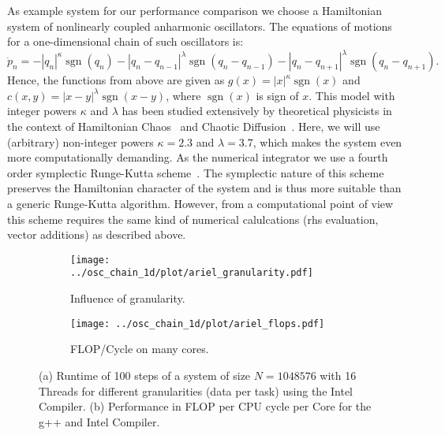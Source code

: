 \documentclass[10pt]{elsarticle}
\newcommand{\sgn}{\operatorname{sgn}}
\begin{document}
As example system for our performance comparison we choose a Hamiltonian system of nonlinearly coupled anharmonic oscillators.
The equations of motions for a one-dimensional chain of such oscillators is:
\begin{equation}
 \dot p_n = -|q_n|^\kappa\sgn(q_n) - |q_n-q_{n-1}|^\lambda\sgn(q_n-q_{n-1}) - |q_n-q_{n+1}|^\lambda\sgn(q_n-q_{n+1}).
\end{equation} 
Hence, the functions from above are given as $g(x) = |x|^\kappa\sgn(x)$ and $c(x,y)=|x-y|^\lambda\sgn(x-y)$, where $\sgn(x)$ is sign of $x$.
This model with integer powers $\kappa$ and $\lambda$ has been studied extensively by theoretical physicists in the context of Hamiltonian Chaos~\cite{Mulansky-Ahnert-Pikovsky-Shepelyansky-11} and Chaotic Diffusion~\cite{Mulansky_Pikovksy_12,mulansky2013energy,Mulansky_phd_12}.
Here, we will use (arbitrary) non-integer powers $\kappa=2.3$ and $\lambda=3.7$, which makes the system even more computationally demanding.
As the numerical integrator we use a fourth order symplectic Runge-Kutta scheme~\cite{McLachlan_95}.
The symplectic nature of this scheme preserves the Hamiltonian character of the system and is thus more suitable than a generic Runge-Kutta algorithm.
However, from a computational point of view this scheme requires the same kind of numerical calulcations (rhs evaluation, vector additions) as described above.

\begin{figure}
 \begin{subfigure}[b]{0.49\textwidth}
  \centering
  \texttt{[image: ../osc\_chain\_1d/plot/ariel\_granularity.pdf]}
  \caption{Influence of granularity.}
  \label{fig:granularity_ariel_1024K}
 \end{subfigure}
 \begin{subfigure}[b]{0.49\textwidth}
  \centering
  \texttt{[image: ../osc\_chain\_1d/plot/ariel\_flops.pdf]}
  \caption{FLOP/Cycle on many cores.}
 \end{subfigure}
 \caption{(a) Runtime of 100 steps of a system of size $N=1048576$ with 16 Threads for different granularities (data per task) using the Intel Compiler. (b) Performance in FLOP per CPU cycle per Core for the g++ and Intel Compiler.} 
 \label{fig:ariel_flops}
\end{figure}
\end{document}
